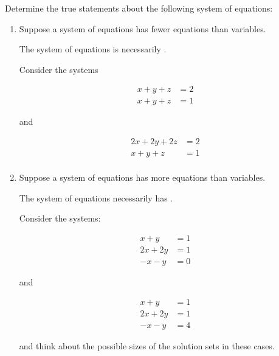 \documentclass{ximera}
\author{Zack Reed}
\begin{document}
\begin{exercise}

    Determine the true statements about the following system of equations:

    \begin{enumerate}

    \item Suppose a system of equations has fewer equations than
    variables. 
    
    The system of equations is necessarily .
    
    
    \begin{hint}
      Consider the systems 

        \begin{align*}
            x+y+z&=2\\
            x+y+z&=1
        \end{align*}

        and

        \begin{align*}
            2x+2y+2z&=2\\
            x+y+z&=1\\
        \end{align*}

    \end{hint}

    \item Suppose a system of equations has more equations than variables.
    
    The system of equations necessarily has
    .

    \begin{hint}
      Consider the systems:

        \begin{align*}
            x+y&=1\\
            2x+2y&=1\\
            -x-y&=0
        \end{align*}

        and

        \begin{align*}
            x+y&=1\\
            2x+2y&=1\\
            -x-y&=4
        \end{align*}

        and think about the possible sizes of the solution sets in these cases.

    \end{hint}
  

\end{enumerate}

\end{exercise}
\end{document}
